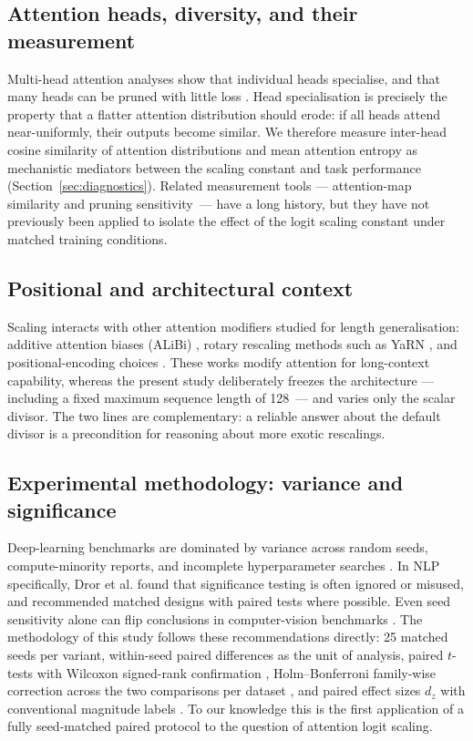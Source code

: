 \subsection{Attention heads, diversity, and their measurement}
Multi-head attention analyses show that individual heads specialise, and that
many heads can be pruned with little loss \cite{voita2019,michel2019}. Head
specialisation is precisely the property that a flatter attention distribution
should erode: if all heads attend near-uniformly, their outputs become similar.
We therefore measure inter-head cosine similarity of attention distributions and
mean attention entropy as mechanistic mediators between the scaling constant and
task performance (Section~\ref{sec:diagnostics}). Related measurement tools ---
attention-map similarity and pruning sensitivity~--- have a long history, but
they have not previously been applied to isolate the effect of the logit scaling
constant under matched training conditions.

\subsection{Positional and architectural context}
Scaling interacts with other attention modifiers studied for length
generalisation: additive attention biases (ALiBi) \cite{press2022}, rotary
rescaling methods such as YaRN \cite{peng2024}, and positional-encoding choices
\cite{kazemnejad2023,chi2023}. These works modify attention for long-context
capability, whereas the present study deliberately freezes the architecture ---
including a fixed maximum sequence length of 128~--- and varies only the scalar
divisor. The two lines are complementary: a reliable answer about the default
divisor is a precondition for reasoning about more exotic rescalings.

\subsection{Experimental methodology: variance and significance}
Deep-learning benchmarks are dominated by variance across random seeds,
compute-minority reports, and incomplete hyperparameter searches
\cite{bouthillier2021,dodge2019}. In NLP specifically, Dror et al. \cite{dror2018}
found that significance testing is often ignored or misused, and recommended
matched designs with paired tests where possible. Even seed sensitivity alone
can flip conclusions in computer-vision benchmarks \cite{picard2021}. The
methodology of this study follows these recommendations directly: 25 matched
seeds per variant, within-seed paired differences as the unit of analysis,
paired $t$-tests with Wilcoxon signed-rank confirmation \cite{wilcoxon1945},
Holm--Bonferroni family-wise correction across the two comparisons per dataset
\cite{holm1979}, and paired effect sizes $d_z$ with conventional magnitude
labels \cite{cohen1988}. To our knowledge this is the first application of a
fully seed-matched paired protocol to the question of attention logit scaling.
